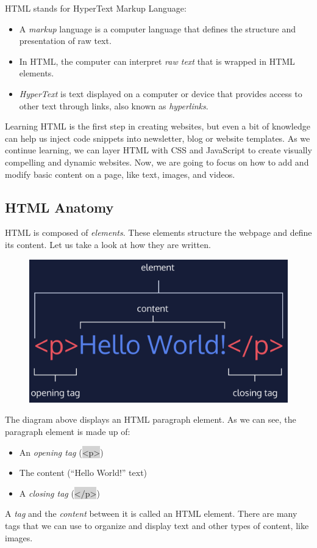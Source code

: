 \documentclass[11pt]{article}
\begin{document}
HTML stands for HyperText Markup Language:
\begin{itemize}[leftmargin = *]
\item A \textit{markup} language is a computer language that defines the structure and presentation of raw text.
\item In HTML, the computer can interpret \textit{raw text} that is wrapped in HTML elements.
\item \textit{HyperText} is text displayed on a computer or device that provides access to other text through links, also known as \textit{hyperlinks}. 
\end{itemize}
Learning HTML is the first step in creating websites, but even a bit of knowledge can help us inject code snippets into newsletter, blog or website templates. As we continue learning, we can layer HTML with CSS and JavaScript to create visually compelling and dynamic websites. Now, we are going to focus on how to add and modify basic content on a page, like text, images, and videos.

\subsection{HTML Anatomy}
HTML is composed of \textit{elements}. These elements structure the webpage and define its content. Let us take a look at how they are written.
\begin{figure}[H]
\includegraphics[scale = 0.2]{1_1}
\centering
\end{figure}
The diagram above displays an HTML paragraph element. As we can see, the paragraph element is made up of:
\begin{itemize}[leftmargin = *]
\item An \textit{opening tag} (\colorbox{lightgray}{<p>})
\item The content (“Hello World!” text)
\item A \textit{closing tag} (\colorbox{lightgray}{<$/$p>})
\end{itemize}
A \textit{tag} and the \textit{content} between it is called an HTML element. There are many tags that we can use to organize and display text and other types of content, like images. 
\end{document}
